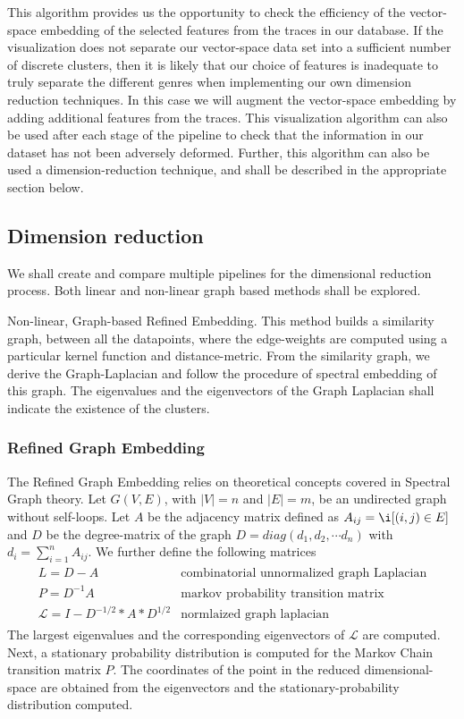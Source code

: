\documentclass[10pt]{article}
\begin{document}
This algorithm provides us the opportunity to check the efficiency of the vector-space embedding of the selected features from the traces in our database.  If the visualization does not separate our vector-space data set into a sufficient number of discrete clusters, then it is likely that our choice of features is inadequate to truly separate the different genres when implementing our own dimension reduction techniques.  In this case we will augment the vector-space embedding by adding additional features from the traces.  This visualization algorithm can also be used after each stage of the pipeline to check that the information in our dataset has not been adversely deformed. Further, this algorithm can also be used a dimension-reduction technique, and shall be described in the appropriate section below.


\subsection{Dimension reduction}
We shall create and compare multiple pipelines for the dimensional reduction process. Both linear and non-linear graph based methods shall be explored. 

Non-linear, Graph-based Refined Embedding. This method builds a similarity graph, between all the datapoints, where the edge-weights are computed using a particular kernel function and distance-metric. From the similarity graph, we derive the Graph-Laplacian and follow the procedure of spectral embedding of this graph. The eigenvalues and the eigenvectors of the Graph Laplacian shall indicate the existence of the clusters. 



\subsubsection{Refined Graph Embedding}
The Refined Graph Embedding relies on theoretical concepts covered in Spectral Graph theory. Let $G(V,E)$, with $|V| = n$ and $|E| = m $, be an undirected graph without self-loops. Let $A$ be the adjacency matrix defined as $A_{ij} = \i[(i,j) \in E]$ and $D$ be the degree-matrix of the graph $D = diag(d_1, d_2, \cdots d_n)$ with $d_i = \sum_{i=1}^n A_{ij}$. We further define the following matrices
\begin{align}
\begin{array}{cc}
L = D-A & \text{combinatorial unnormalized graph Laplacian}\\
P = D^{-1}A & \text{markov probability transition matrix}\\
\mathcal{L} = I - D^{-1/2}*A*D^{1/2} & \text{normlaized graph laplacian}
\end{array}
\end{align}
The largest eigenvalues and the corresponding eigenvectors of $\mathcal{L}$ are computed. Next, a stationary probability distribution is computed for the Markov Chain transition matrix $P$. The coordinates of the point in the reduced dimensional-space are obtained from the eigenvectors and the stationary-probability distribution computed. 
\end{document}
